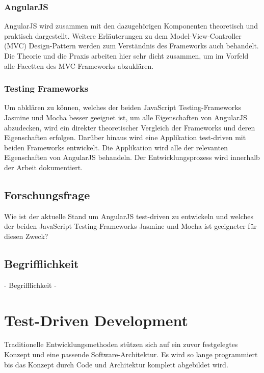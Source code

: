 \subsubsection{AngularJS}
AngularJS wird zusammen mit den dazugehörigen Komponenten theoretisch und
praktisch dargestellt. Weitere Erläuterungen zu dem {\glqq 
Model-View-Controller (MVC)\grqq} Design-Pattern werden zum Verständnis des
Frameworks auch behandelt.
Die Theorie und die Praxis arbeiten hier sehr dicht zusammen, um im Vorfeld
alle Facetten des MVC-Frameworks abzuklären.

\subsubsection{Testing Frameworks}
Um abklären zu können, welches der beiden JavaScript Testing-Frameworks 
{\glqq Jasmine\grqq} und {\glqq Mocha\grqq} besser geeignet ist, um alle
Eigenschaften von AngularJS abzudecken, wird ein direkter theoretischer
Vergleich der Frameworks und deren Eigenschaften erfolgen. Darüber hinaus wird 
eine Applikation test-driven mit beiden Frameworks entwickelt. Die Applikation
wird alle der relevanten Eigenschaften von AngularJS behandeln. Der 
Entwicklungsprozess wird innerhalb der Arbeit dokumentiert.

\subsection{Forschungsfrage}
Wie ist der aktuelle Stand um AngularJS test-driven zu entwickeln und welches 
der beiden JavaScript Testing-Frameworks {\glqq Jasmine\grqq} und {\glqq 
Mocha\grqq} ist geeigneter für diesen Zweck?

\subsection{Begrifflichkeit}
 - Begrifflichkeit -

\newpage

\section{Test-Driven Development}
\label{section:Test-Driven Development}
\begin{center}
\autocite[22]{Johansen:2011}
\end{center}
Traditionelle Entwicklungsmethoden stützen sich auf ein zuvor festgelegtes Konzept und eine passende Software-Architektur. Es wird so lange programmiert bis das Konzept durch Code und Architektur komplett abgebildet wird.

